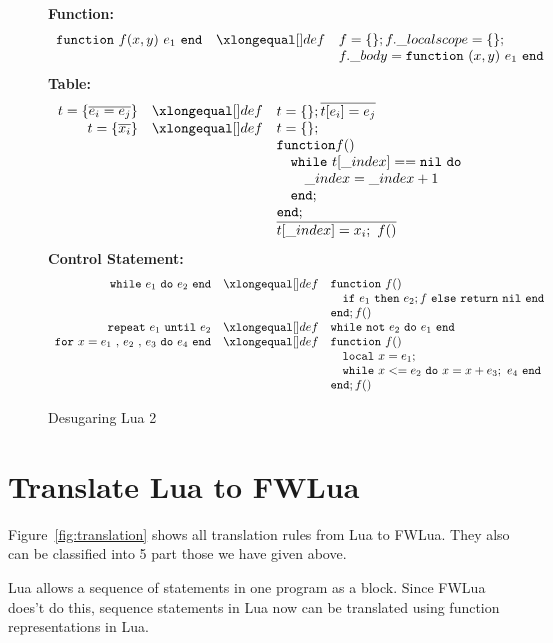 \begin{figure}
\caption{Desugaring Lua 2}\label{fig:desLua2}
{\bf Function:}\[
\begin{array}{rclcl}
\desugar{{\tt function}~f(x,y)~e_1~{\tt end}}{f = \{\}; f.\_localscope = \{\};}
\desugarline{f.\_body = {\tt function}~(x,y)~e_1~{\tt end}}
\end{array}\]
{\bf Table:}\[
\begin{array}{rclcl}
\desugar{t = \{\overline{e_i = e_j}\}}{t = \{\}; \overline{t[e_i]=e_j}}
\desugar{t = \{\overline{x_i}\}}{t = \{\};}
\desugarline{ {\tt function} f()\\ 
   \quad {\tt while}~t[\_index] == {\tt nil~do}\\
   \quad\quad \_index = \_index + 1~ \\
   \quad{\tt end};\\
   {\tt end};\\
   \overline{t[\_index] = x_i;~f()}\\
 }
\end{array}\]
{\bf Control Statement:}\[
\begin{array}{rclcl}
\desugar{{\tt while}~e_1~{\tt do}~e_2~{\tt end}}{
    {\tt function}~f()
}
\desugarline{ \quad{\tt if}~e_1~{\tt then}~e_2;f~{\tt else}~{\tt return}~{\tt nil}~{\tt end}\\
{\tt end};f()
}
\desugar{{\tt repeat}~e_1~{\tt until}~e_2}{
   {\tt while}~{\tt not}~e_2~{\tt do}~e_1~{\tt end}\\
}
\desugar{{\tt for}~x=e_1~{\tt ,}~e_2~{\tt ,}~e_3~{\tt do}~e_4~{\tt end}}{
    {\tt function}~f()
}
\desugarline{
    \quad {\tt local}~x = e_1;\\
    \quad {\tt while}~x<= e_2~{\tt do}~x = x + e_3;~e_4~{\tt end}\\
    {\tt end};f()\\
}
\end{array}\]
\end{figure}


\section{Translate Lua to FWLua}\label{TLFL}
Figure~\ref{fig:translation} shows all translation rules from Lua to FWLua. They also can be classified into 5 part those we have given above.

Lua allows a sequence of statements in one program as a block. Since FWLua does't do this, sequence statements in Lua now can be translated using function representations in Lua.

